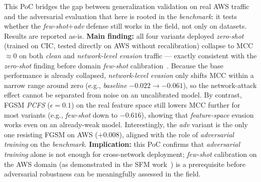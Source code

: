 \documentclass[preprint,12pt,authoryear]{elsarticle}
\begin{document}
\noindent This PoC bridges the gap between generalization validation on real AWS
traffic~\citep{martono2024sfm} and the adversarial evaluation that here is rooted in
the \emph{benchmark}: it tests whether the \emph{few-shot$+$adv} defense still works
in the field, not only on datasets. Results are reported as-is. \textbf{Main
finding:} all four variants deployed \emph{zero-shot} (trained on CIC, tested
directly on AWS without recalibration) collapse to MCC $\approx 0$ on both
\emph{clean} and \emph{network-level evasion} traffic --- exactly consistent with the
\emph{zero-shot} finding before domain \emph{few-shot} calibration~\citep{martono2024sfm}.
Because the base performance is already collapsed, \emph{network-level evasion} only
shifts MCC within a narrow range around zero (e.g., \emph{baseline}
$-0.022 \rightarrow -0.061$), so the network-attack effect cannot be separated from
noise on an uncalibrated model. By contrast, FGSM \emph{PCFS} ($\epsilon=0.1$) on the
real feature space still lowers MCC further for most variants (e.g., \emph{few-shot}
down to $-0.616$), showing that \emph{feature-space} evasion works even on an
already-weak model. Interestingly, the \emph{adv} variant is the only one resisting
FGSM on AWS ($+0.008$), aligned with the role of \emph{adversarial training} on the
\emph{benchmark}. \textbf{Implication:} this PoC confirms that \emph{adversarial
training} alone is not enough for cross-network deployment; \emph{few-shot}
calibration on the AWS domain (as demonstrated in the SFM work~\citep{martono2024sfm})
is a prerequisite before adversarial robustness can be meaningfully assessed in the
field.
\end{document}
